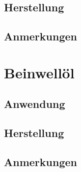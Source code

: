 \subsection{Herstellung}

\subsection{Anmerkungen}








\section{Beinwellöl}

\subsection{Anwendung}

\subsection{Herstellung}

\subsection{Anmerkungen}



